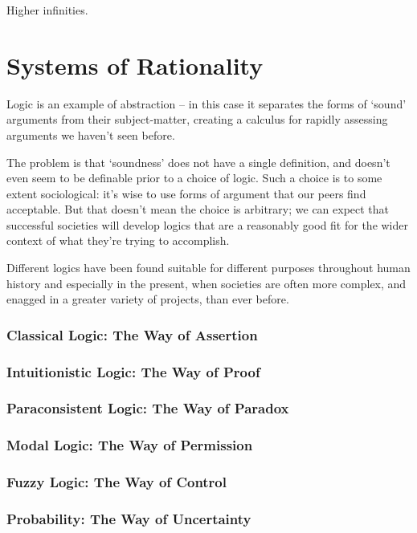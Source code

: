 \documentclass[oneside,english]{amsbook}
\numberwithin{section}{chapter}
\theoremstyle{plain}
\theoremstyle{definition}
\begin{document}
Higher infinities.

\chapter{Systems of Rationality}

Logic is an example of abstraction -- in this case it separates the forms of `sound' arguments from their subject-matter, creating a calculus for rapidly assessing arguments we haven't seen before. 

The problem is that `soundness' does not have a single definition, and doesn't even seem to be definable prior to a choice of logic. Such a choice is to some extent sociological: it's wise to use forms of argument that our peers find acceptable. But that doesn't mean the choice is arbitrary; we can expect that successful societies will develop logics that are a reasonably good fit for the wider context of what they're trying to accomplish. 

Different logics have been found suitable for different purposes throughout human history and especially in the present, when societies are often more complex, and enagged in a greater variety of projects, than ever before.

\subsection{Classical Logic: The Way of Assertion}

\subsection{Intuitionistic Logic: The Way of Proof}

\subsection{Paraconsistent Logic: The Way of Paradox}

\subsection{Modal Logic: The Way of Permission}

\subsection{Fuzzy Logic: The Way of Control}

\subsection{Probability: The Way of Uncertainty}
\end{document}

